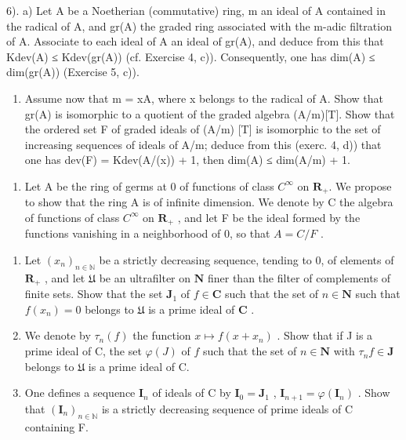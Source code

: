 6). a) Let A be a Noetherian (commutative) ring, m an ideal of A contained in the radical of A, and gr(A) the graded ring associated with the m-adic filtration of A. Associate to each ideal of A an ideal of gr(A), and deduce from this that Kdev(A) ≤ Kdev(gr(A)) (cf. Exercise 4, c)). Consequently, one has dim(A) ≤ dim(gr(A)) (Exercise 5, c)).

\begin{enumerate}
\def\labelenumi{\alph{enumi})}
\setcounter{enumi}{1}
\tightlist
\item
  Assume now that m = xA, where x belongs to the radical of A. Show that gr(A) is isomorphic to a quotient of the graded algebra (A/m)[T]. Show that the ordered set F of graded ideals of (A/m) {[}T{]} is isomorphic to the set of increasing sequences of ideals of A/m; deduce from this (exerc. 4, d)) that one has dev(F) = Kdev(A/(x)) + 1, then dim(A) ≤ dim(A/m) + 1.
\end{enumerate}

\begin{enumerate}
\def\labelenumi{\arabic{enumi})}
\setcounter{enumi}{6}
\tightlist
\item
  Let A be the ring of germs at 0 of functions of class \(C^\infty\) on \(\mathbf{R}_{+}\). We propose to show that the ring A is of infinite dimension. We denote by C the algebra of functions of class \(C^\infty\) on \(\mathbf{R}_{+}\) , and let F be the ideal formed by the functions vanishing in a neighborhood of 0, so that \(A = C / F\) .
\end{enumerate}

\begin{enumerate}
\def\labelenumi{\alph{enumi})}
\item
  Let \((x_{n})_{n\in \mathbb{N}}\) be a strictly decreasing sequence, tending to 0, of elements of \(\mathbf{R}_{+}\) , and let \(\mathfrak{U}\) be an ultrafilter on \(\mathbf{N}\) finer than the filter of complements of finite sets. Show that the set \(\mathbf{J}_1\) of \(f\in \mathbf{C}\) such that the set of \(n\in \mathbf{N}\) such that \(f(x_{n}) = 0\) belongs to \(\mathfrak{U}\) is a prime ideal of \(\mathbf{C}\) .
\item
  We denote by \(\tau_{n}(f)\) the function \(x\mapsto f(x + x_{n})\) . Show that if J is a prime ideal of C, the set \(\varphi(J)\) of \(f\) such that the set of \(n\in\mathbf{N}\) with \(\tau_{n}f\in\mathbf{J}\) belongs to \(\mathfrak{U}\) is a prime ideal of C.
\item
  One defines a sequence \(\mathbf{I}_n\) of ideals of C by \(\mathbf{I}_0 = \mathbf{J}_1\) , \(\mathbf{I}_{n+1} = \varphi(\mathbf{I}_n)\) . Show that \((\mathbf{I}_n)_{n\in\mathbb{N}}\) is a strictly decreasing sequence of prime ideals of C containing F.
\end{enumerate}


